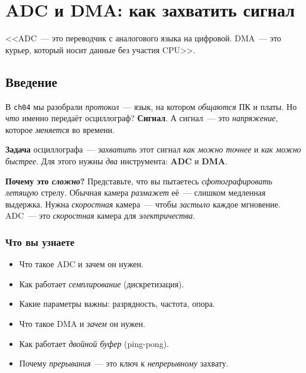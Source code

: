 
\chapter{ADC и DMA: как захватить сигнал}
\label{ch:adc-dma}

\epigraph{<<ADC~--- это переводчик с аналогового языка на цифровой.
DMA~--- это курьер, который носит данные без участия CPU>>.}{}

\section{Введение}
\label{sec:adc-intro}

В \texttt{ch04} мы разобрали \emph{протокол}~--- язык, на
котором \emph{общаются} ПК и платы. Но \emph{что} именно
передаёт осциллограф? \textbf{Сигнал}. А сигнал~---
это \emph{напряжение}, которое \emph{меняется} во времени.

\textbf{Задача} осциллографа~--- \emph{захватить} этот
сигнал \emph{как можно точнее} и \emph{как можно быстрее}.
Для этого нужны \emph{два} инструмента: \textbf{ADC}
и \textbf{DMA}.

\begin{ideabox}
\textbf{Почему это \emph{сложно}?} Представьте, что вы
пытаетесь \emph{сфотографировать} \emph{летящую} стрелу.
Обычная камера \emph{размажет} её~--- слишком медленная
выдержка. Нужна \emph{скоростная} камера~--- чтобы
\emph{застыло} каждое мгновение. ADC~--- это \emph{скоростная}
камера для \emph{электричества}.
\end{ideabox}

\subsection{Что вы узнаете}

\begin{itemize}
    \item Что такое ADC и зачем он нужен.
    \item Как работает \emph{семплирование} (дискретизация).
    \item Какие параметры важны: разрядность, частота, опора.
    \item Что такое DMA и \emph{зачем} он нужен.
    \item Как работает \emph{двойной буфер} (ping-pong).
    \item Почему \emph{прерывания}~--- это ключ к \emph{непрерывному}
          захвату.
\end{itemize}

